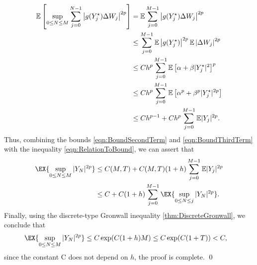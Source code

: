 \documentclass[sort&compress, preprint]{elsarticle}
\theoremstyle{definition}
\theoremstyle{plain}%
\theoremstyle{remark}
\newcommand{\m}[1]{\mathbb{E}#1}
\begin{document}
\begin{pf}
\begin{align}
	\m\left[
		\sup_{0\leq N \leq M}
			\sum_{j=0}^{N-1}
			\left|
				g(Y_j^{\star})\Delta W_j
			\right|^{2p}	
		\right]
		&=
			\m
				\sum_{j=0}^{M-1}
					\left|
						g(Y_j^{\star})\Delta W_j
					\right|^{2p}
			\notag\\
		&\leq	
			\sum_{j=0}^{M-1}
				\m
					\left|
						g(Y_j^{\star})
					\right|^{2p}
				\m
					\left|
						\Delta W_j
					\right|^{2p}
			\notag \\
		&\leq
			C h^p
			\sum_{j=0}^{M-1}
			\m
				\left[
					\alpha +\beta|Y^{\star}_j|^2
				\right]^p
			\notag\\
		&\leq
			Ch^p
			\sum_{j=0}^{M-1}
			\m
				\left[
					\alpha ^p +\beta^p |Y^{\star}_j|^{2p}
				\right]
			\notag\\
		&\leq
		Ch^{p-1}
		+
		Ch^p \sum_{j=0}^{M-1}
			\m|Y_j|^{2p} \label{eqn:BoundThirdTerm}.
	\end{align}
	Thus, combining the bounds \eqref{eqn:BoundSecondTerm} and \eqref{eqn:BoundThirdTerm} with the inequality 
	\eqref{eqn:RelationToBound}, we can assert that
	\begin{align}
		\EX{
			\sup_{0\leq N \leq M}
					|Y_N|^{2p} 
		}
		&\leq
			C(M,T) + C(M,T)(1+h)
			\sum_{j=0}^{M-1}
				\m|Y_j|^{2p}  
			\notag \\
		&\leq	
			C +C(1+h) 
			\sum_{j=0}^{M-1}
				\EX{
					\sup_{0\leq N \leq j}
					|Y_N|^{2p}
				}	
		.
	\end{align}
	Finally, using the discrete-type Gronwall inequality \eqref{thm:DiscreteGronwall}, we conclude that
	\begin{align*}
		\EX{
			\sup_{0\leq N \leq M}
			|Y_N|^{2p} 
		}	
		&\leq
			C\exp(C(1+h)M) 
		\leq 
		C \exp(C(1+T))<C,
	\end{align*}
	since the constant C does not depend on $h$, the proof is complete. \qed
\end{pf}
	
\end{document}
